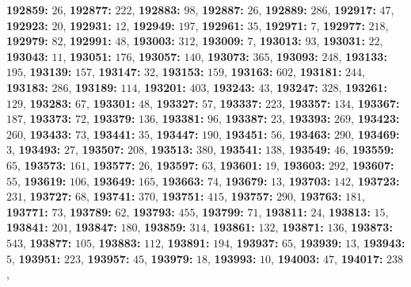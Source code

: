 \textsf{\bfseries 192859:} $26$, \textsf{\bfseries 192877:} $222$, \textsf{\bfseries 192883:} $98$, \textsf{\bfseries 192887:} $26$, \textsf{\bfseries 192889:} $286$, \textsf{\bfseries 192917:} $47$, \textsf{\bfseries 192923:} $20$, \textsf{\bfseries 192931:} $12$, \textsf{\bfseries 192949:} $197$, \textsf{\bfseries 192961:} $35$, \textsf{\bfseries 192971:} $7$, \textsf{\bfseries 192977:} $218$, \textsf{\bfseries 192979:} $82$, \textsf{\bfseries 192991:} $48$, \textsf{\bfseries 193003:} $312$, \textsf{\bfseries 193009:} $7$, \textsf{\bfseries 193013:} $93$, \textsf{\bfseries 193031:} $22$, \textsf{\bfseries 193043:} $11$, \textsf{\bfseries 193051:} $176$, \textsf{\bfseries 193057:} $140$, \textsf{\bfseries 193073:} $365$, \textsf{\bfseries 193093:} $248$, \textsf{\bfseries 193133:} $195$, \textsf{\bfseries 193139:} $157$, \textsf{\bfseries 193147:} $32$, \textsf{\bfseries 193153:} $159$, \textsf{\bfseries 193163:} $602$, \textsf{\bfseries 193181:} $244$, \textsf{\bfseries 193183:} $286$, \textsf{\bfseries 193189:} $114$, \textsf{\bfseries 193201:} $403$, \textsf{\bfseries 193243:} $43$, \textsf{\bfseries 193247:} $328$, \textsf{\bfseries 193261:} $129$, \textsf{\bfseries 193283:} $67$, \textsf{\bfseries 193301:} $48$, \textsf{\bfseries 193327:} $57$, \textsf{\bfseries 193337:} $223$, \textsf{\bfseries 193357:} $134$, \textsf{\bfseries 193367:} $187$, \textsf{\bfseries 193373:} $72$, \textsf{\bfseries 193379:} $136$, \textsf{\bfseries 193381:} $96$, \textsf{\bfseries 193387:} $23$, \textsf{\bfseries 193393:} $269$, \textsf{\bfseries 193423:} $260$, \textsf{\bfseries 193433:} $73$, \textsf{\bfseries 193441:} $35$, \textsf{\bfseries 193447:} $190$, \textsf{\bfseries 193451:} $56$, \textsf{\bfseries 193463:} $290$, \textsf{\bfseries 193469:} $3$, \textsf{\bfseries 193493:} $27$, \textsf{\bfseries 193507:} $208$, \textsf{\bfseries 193513:} $380$, \textsf{\bfseries 193541:} $138$, \textsf{\bfseries 193549:} $46$, \textsf{\bfseries 193559:} $65$, \textsf{\bfseries 193573:} $161$, \textsf{\bfseries 193577:} $26$, \textsf{\bfseries 193597:} $63$, \textsf{\bfseries 193601:} $19$, \textsf{\bfseries 193603:} $292$, \textsf{\bfseries 193607:} $55$, \textsf{\bfseries 193619:} $106$, \textsf{\bfseries 193649:} $165$, \textsf{\bfseries 193663:} $74$, \textsf{\bfseries 193679:} $13$, \textsf{\bfseries 193703:} $142$, \textsf{\bfseries 193723:} $231$, \textsf{\bfseries 193727:} $68$, \textsf{\bfseries 193741:} $370$, \textsf{\bfseries 193751:} $415$, \textsf{\bfseries 193757:} $290$, \textsf{\bfseries 193763:} $181$, \textsf{\bfseries 193771:} $73$, \textsf{\bfseries 193789:} $62$, \textsf{\bfseries 193793:} $455$, \textsf{\bfseries 193799:} $71$, \textsf{\bfseries 193811:} $24$, \textsf{\bfseries 193813:} $15$, \textsf{\bfseries 193841:} $201$, \textsf{\bfseries 193847:} $180$, \textsf{\bfseries 193859:} $314$, \textsf{\bfseries 193861:} $132$, \textsf{\bfseries 193871:} $136$, \textsf{\bfseries 193873:} $543$, \textsf{\bfseries 193877:} $105$, \textsf{\bfseries 193883:} $112$, \textsf{\bfseries 193891:} $194$, \textsf{\bfseries 193937:} $65$, \textsf{\bfseries 193939:} $13$, \textsf{\bfseries 193943:} $5$, \textsf{\bfseries 193951:} $223$, \textsf{\bfseries 193957:} $45$, \textsf{\bfseries 193979:} $18$, \textsf{\bfseries 193993:} $10$, \textsf{\bfseries 194003:} $47$, \textsf{\bfseries 194017:} $238$, 
